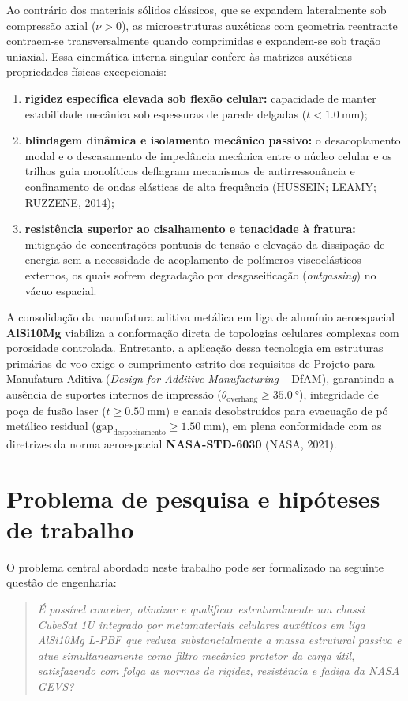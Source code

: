Ao contrário dos materiais sólidos clássicos, que se expandem lateralmente sob compressão axial ($\nu > 0$), as microestruturas auxéticas com geometria reentrante contraem-se transversalmente quando comprimidas e expandem-se sob tração uniaxial. Essa cinemática interna singular confere às matrizes auxéticas propriedades físicas excepcionais:
\begin{enumerate}
  \item \textbf{rigidez específica elevada sob flexão celular:} capacidade de manter estabilidade mecânica sob espessuras de parede delgadas ($t < \SI{1.0}{\milli\metre}$);
  \item \textbf{blindagem dinâmica e isolamento mecânico passivo:} o desacoplamento modal e o descasamento de impedância mecânica entre o núcleo celular e os trilhos guia monolíticos deflagram mecanismos de antirressonância e confinamento de ondas elásticas de alta frequência (HUSSEIN; LEAMY; RUZZENE, 2014);
  \item \textbf{resistência superior ao cisalhamento e tenacidade à fratura:} mitigação de concentrações pontuais de tensão e elevação da dissipação de energia sem a necessidade de acoplamento de polímeros viscoelásticos externos, os quais sofrem degradação por desgaseificação (\textit{outgassing}) no vácuo espacial.
\end{enumerate}

A consolidação da manufatura aditiva metálica em liga de alumínio aeroespacial \textbf{AlSi10Mg} viabiliza a conformação direta de topologias celulares complexas com porosidade controlada. Entretanto, a aplicação dessa tecnologia em estruturas primárias de voo exige o cumprimento estrito dos requisitos de Projeto para Manufatura Aditiva (\textit{Design for Additive Manufacturing} -- DfAM), garantindo a ausência de suportes internos de impressão ($\theta_{\text{overhang}} \ge \SI{35.0}{\degree}$), integridade de poça de fusão laser ($t \ge \SI{0.50}{\milli\metre}$) e canais desobstruídos para evacuação de pó metálico residual ($\text{gap}_{\text{despoeiramento}} \ge \SI{1.50}{\milli\metre}$), em plena conformidade com as diretrizes da norma aeroespacial \textbf{NASA-STD-6030} (NASA, 2021).

\section{Problema de pesquisa e hipóteses de trabalho}
\label{sec:problema_hipoteses}

O problema central abordado neste trabalho pode ser formalizado na seguinte questão de engenharia:
\begin{quote}
  \itshape
  É possível conceber, otimizar e qualificar estruturalmente um chassi CubeSat 1U integrado por metamateriais celulares auxéticos em liga AlSi10Mg L-PBF que reduza substancialmente a massa estrutural passiva e atue simultaneamente como filtro mecânico protetor da carga útil, satisfazendo com folga as normas de rigidez, resistência e fadiga da NASA GEVS?
\end{quote}

